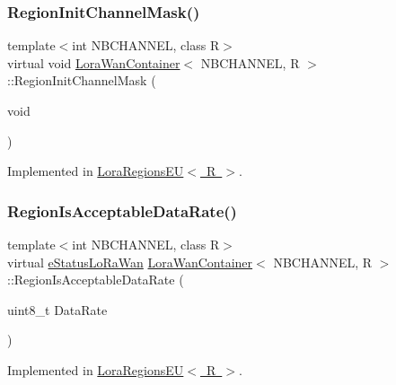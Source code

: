 \subsubsection{\texorpdfstring{Region\+Init\+Channel\+Mask()}{RegionInitChannelMask()}}
{\footnotesize\ttfamily template$<$int N\+B\+C\+H\+A\+N\+N\+EL, class R$>$ \\
virtual void \mbox{\hyperlink{class_lora_wan_container}{Lora\+Wan\+Container}}$<$ N\+B\+C\+H\+A\+N\+N\+EL, R $>$\+::Region\+Init\+Channel\+Mask (\begin{DoxyParamCaption}\item[{void}]{ }\end{DoxyParamCaption})\hspace{0.3cm}{\ttfamily [pure virtual]}}



Implemented in \mbox{\hyperlink{class_lora_regions_e_u_a3662471b098dc1e319ab386eaf0b3f52}{Lora\+Regions\+E\+U$<$ R $>$}}.

\mbox{\label{class_lora_wan_container_a8316ea2c314c3809fa7c6b8e72e25df0}} 
\subsubsection{\texorpdfstring{Region\+Is\+Acceptable\+Data\+Rate()}{RegionIsAcceptableDataRate()}}
{\footnotesize\ttfamily template$<$int N\+B\+C\+H\+A\+N\+N\+EL, class R$>$ \\
virtual \mbox{\hyperlink{_define_8h_a1cea710adbbf5b02bced8f79cd82f7b9}{e\+Status\+Lo\+Ra\+Wan}} \mbox{\hyperlink{class_lora_wan_container}{Lora\+Wan\+Container}}$<$ N\+B\+C\+H\+A\+N\+N\+EL, R $>$\+::Region\+Is\+Acceptable\+Data\+Rate (\begin{DoxyParamCaption}\item[{uint8\+\_\+t}]{Data\+Rate }\end{DoxyParamCaption})\hspace{0.3cm}{\ttfamily [pure virtual]}}



Implemented in \mbox{\hyperlink{class_lora_regions_e_u_a367dcb126971269dce46511383696bad}{Lora\+Regions\+E\+U$<$ R $>$}}.

\mbox{\label{class_lora_wan_container_a2eea298e891240d3367f2405b852964a}} 
